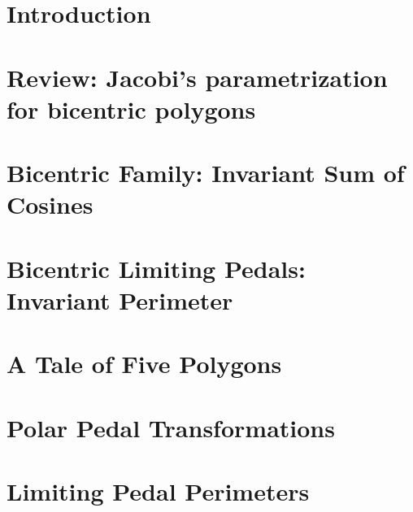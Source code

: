 
\section{ Introduction}
\label{sec:05_introd}



\section{Review: Jacobi's parametrization for bicentric polygons}
\label{sec:jacobi}


\section{Bicentric Family: Invariant Sum of Cosines}
\label{sec:bicentric-sum-of-cosines}
  

%  


\section{Bicentric Limiting Pedals: Invariant Perimeter}
\label{sec:pedal-perimeter}
  

\section{A Tale of Five Polygons}
\label{sec:five-polys}
  

%

 
\section{Polar Pedal Transformations}
\label{app:polar-pedal}
  

 
 
 \section{Limiting Pedal Perimeters}
 \label{app:explicit-perimeter}
 

